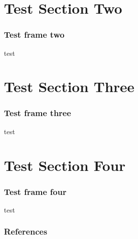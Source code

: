 \documentclass[10pt,compress]{beamer}
\begin{document}
\section{Test Section Two}
\begin{frame}\frametitle{Test frame two}test\end{frame}
\section{Test Section Three}
\begin{frame}\frametitle{Test frame three}test\end{frame}
\section{Test Section Four}
\begin{frame}\frametitle{Test frame four}test\end{frame}


\begin{frame}[allowframebreaks]\frametitle{References}

\end{frame}
\end{document}
